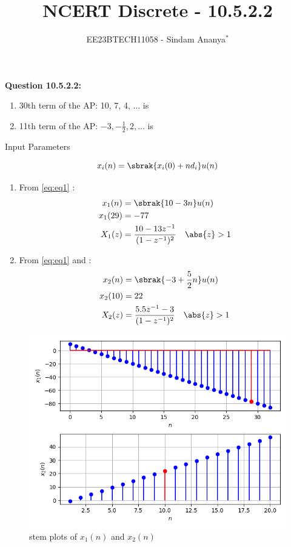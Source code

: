 \documentclass[journal,12pt,twocolumn]{IEEEtran}
\theoremstyle{remark}
\begin{document}

\vspace{3cm}

\title{NCERT Discrete - 10.5.2.2}
\author{EE23BTECH11058 - Sindam Ananya$^{*}$%
}
\maketitle
\newpage
\bigskip

\renewcommand{\thefigure}{\theenumi}
\renewcommand{\thetable}{\theenumi}

\vspace{3cm}
\textbf{Question 10.5.2.2:} 
\begin{enumerate}
\item 30th term of the AP: 10, 7, 4, $\ldots$ is 
\item 11th term of the AP: $-3, -\frac{1}{2}, 2, \ldots$ is
\end{enumerate}
\solution
\fi
\begin{table}[h!]
    \centering
    
    \caption{Input Parameters}
    \label{tab:table1}
    \end{table}
\begin{equation}
    x_i(n) = \sbrak{x_i(0) + nd_i} u(n)
    \label{eq:eq1}
\end{equation}
\begin{enumerate}
\item From \eqref{eq:eq1}  :
\begin{align}
x_1(n) &= \sbrak{10 -3n}u(n)\\
x_1(29) &= -77\\
X_1(z) &= \frac{10 - 13z^{-1}}{(1-z^{-1})^2} \quad \abs{z} > 1
\end{align}
\item From \eqref{eq:eq1} and  :
\begin{align}
x_2(n) &= \sbrak{-3 + \frac{5}{2}n}u(n)\\
x_2(10) &= 22\\
X_2(z) &= \frac{5.5z^{-1}-3}{(1-z^{-1})^2} \quad \abs{z}> 1
\end{align}
\end{enumerate}
\begin{figure}[h!]
    \centering
    \includegraphics[width=\columnwidth]{ncert-maths/10/5/2/2/figs/plot.png}
    \caption{stem plots of $x_1(n)$ and $x_2(n)$}
    \label{fig:1}
\end{figure}
\end{document}
